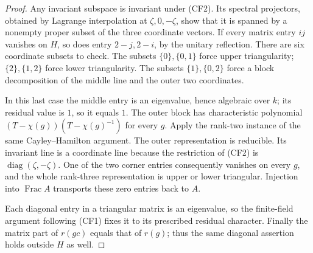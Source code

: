 \begin{proof}
Any invariant subspace is invariant under (CF2).
Its spectral projectors, obtained by Lagrange interpolation
at \(\zeta,0,-\zeta\), show that it is spanned by
a nonempty proper subset of the three coordinate vectors.
If every matrix entry \(ij\) vanishes on \(H\), so does
entry \(2-j,2-i\), by the unitary reflection.
There are six coordinate subsets to check.
The subsets \(\{0\},\{0,1\}\) force upper triangularity;
\(\{2\},\{1,2\}\) force lower triangularity.
The subsets \(\{1\},\{0,2\}\) force a block decomposition
of the middle line and the outer two coordinates.

In this last case the middle entry is an eigenvalue,
hence algebraic over \(k\); its residual value is \(1\),
so it equals \(1\).
The outer block has characteristic polynomial
\((T-\chi(g))(T-\chi(g)^{-1})\) for every \(g\).
Apply the rank-two instance of the same
Cayley--Hamilton argument.
The outer representation is reducible.
Its invariant line is a coordinate line because
the restriction of (CF2) is
\(\operatorname{diag}(\zeta,-\zeta)\).
One of the two corner entries consequently vanishes
on every \(g\), and the whole rank-three representation
is upper or lower triangular.
Injection into \(\operatorname{Frac}A\) transports
these zero entries back to \(A\).

Each diagonal entry in a triangular matrix is an
eigenvalue, so the finite-field argument following
(CF1) fixes it to its prescribed residual character.
Finally the matrix part of \(r(gc)\) equals that of
\(r(g)\); thus the same diagonal assertion holds
outside \(H\) as well.
\end{proof}

